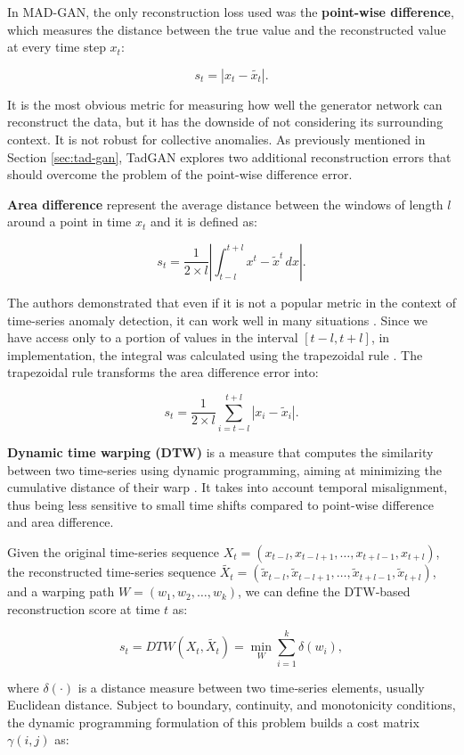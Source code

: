 In MAD-GAN, the only reconstruction loss used was the \textbf{point-wise difference}, which measures the distance between the true value and the reconstructed value at every time step $x_t$:

$$s_t = \left| x_t - \tilde{x_t}\right|.$$

It is the most obvious metric for measuring how well the generator network can reconstruct the data, but it has the downside of not considering its surrounding context. It is not robust for collective anomalies. As previously mentioned in Section \ref{sec:tad-gan}, TadGAN explores two additional reconstruction errors that should overcome the problem of the point-wise difference error. 

\textbf{Area difference} \cite{geiger2020tadgan} represent the average distance between the windows of length $l$ around a point in time $x_t$ and it is defined as:

$$s_t = \frac{1}{2 \times l} \left| \int_{t-l}^{t+l} x^t - \tilde{x}^t\,dx \right|.$$

The authors demonstrated that even if it is not a popular metric in the context of time-series anomaly detection, it can work well in many situations \cite{geiger2020tadgan}. Since we have access only to a portion of values in the interval $[ t-l, t+l]$, in implementation, the integral was calculated using the trapezoidal rule \cite{geiger2020tadgan}. The trapezoidal rule transforms the area difference error into:

$$s_t = \frac{1}{2 \times l} \sum_{i=t-l}^{t+l} \left| x_{i} - \tilde{x}_{i} \right|.$$

\textbf{Dynamic time warping (DTW)} is a measure that computes the similarity between two time-series using dynamic programming, aiming at minimizing the cumulative distance of their warp \cite{berndt1994dtw}. It takes into account temporal misalignment, thus being less sensitive to small time shifts compared to point-wise difference and area difference. 

Given the original time-series sequence $X_t = (x_{t-l}, x_{t-l+1},\dots,x_{t+l-1}, x_{t+l})$, the reconstructed time-series sequence $\tilde{X_t} = (\tilde{x}_{t-l}, \tilde{x}_{t-l+1},\dots, \tilde{x}_{t+l-1}, \tilde{x}_{t+l})$, and a warping path $W = (w_1, w_2, \dots, w_k)$, we can define the DTW‑based reconstruction score at time $t$ as:

$$s_t = DTW(X_t, \tilde{X_t})= \min_W \sum_{i=1}^k \delta(w_i),$$

where $\delta(\cdot)$ is a distance measure between two time‑series elements, usually Euclidean distance. Subject to boundary, continuity, and monotonicity conditions, the dynamic programming formulation of this problem builds a cost matrix $\gamma(i,j)$ as:

